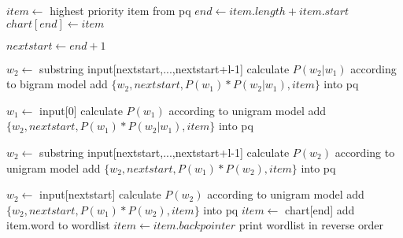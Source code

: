 \documentclass[11pt]{article}
\begin{document}
\begin{algorithm}[htb]
	\begin{algorithmic}[1]

		\STATE $item \gets$ highest priority item from pq
		\STATE $end \gets item.length+item.start$ 
		\STATE $chart[end] \gets item$
		\ENDIF
		
		\STATE $nextstart \gets end+1$
		
		\STATE $w_2 \gets$ substring input[nextstart,...,nextstart+l-1] 
		\STATE calculate $P(w_2|w_1)$ according to bigram model 
		\STATE add $\{w_2,nextstart, P(w_1)*P(w_2|w_1),item\}$ into pq
		\ENDFOR
		
		\STATE $w_1 \gets$ input[0]
		\STATE calculate $P(w_1)$ according to unigram model  
		\STATE add $\{w_2,nextstart,P(w_1)*P(w_2|w_1),item\}$ into pq
		\ENDIF
		
		\ELSE
		\STATE $w_2 \gets$ substring input[nextstart,...,nextstart+l-1] 
		\STATE calculate $P(w_2)$ according to unigram model 
		\STATE add $\{w_2,nextstart,P(w_1)*P(w_2),item\}$ into pq
		\ENDFOR
		
		\STATE $w_2 \gets$ input[nextstart]
		\STATE calculate $P(w_2)$ according to unigram model  
		\STATE add $\{w_2,nextstart,P(w_1)*P(w_2),item\}$ into pq
		\ENDIF
		\ENDIF
		\ENDWHILE
		\STATE $item \gets$ chart[end]
		\STATE add item.word to wordlist
		\STATE $item \gets item.backpointer$
		\ENDWHILE
		\STATE print wordlist in reverse order
	\end{algorithmic}
\end{algorithm}
\end{document}
